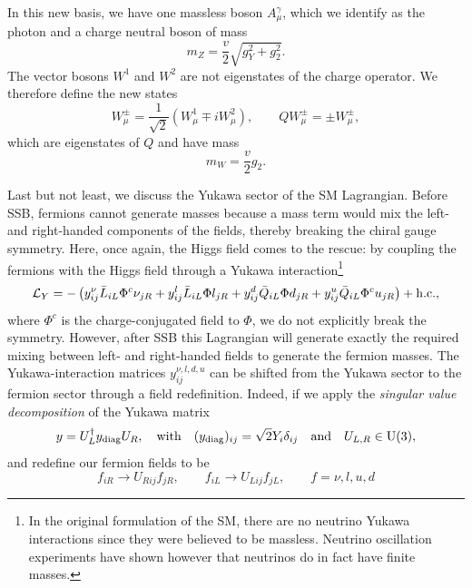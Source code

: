 In this new basis, we have one massless boson $A^\gamma_\mu$, which we identify as the photon and a charge neutral boson of mass
\begin{equation}
m_Z = \frac{v}{2} \sqrt{g_Y^2 + g_2^2}.
\end{equation}
The vector bosons $W^1$ and $W^2$ are not eigenstates of the charge operator. We therefore define the new states
\begin{equation}
W^\pm_\mu = \frac{1}{\sqrt{2}} \left( W^1_\mu \mp i W^2_\mu \right), \qquad Q W_\mu^\pm = \pm W_\mu^\pm,
\end{equation}
which are eigenstates of $Q$ and have mass
\begin{equation}
m_W = \frac{v}{2} g_2.
\end{equation}

Last but not least, we discuss the Yukawa sector of the \acs{SM} Lagrangian. Before \acs{SSB}, fermions cannot generate masses because a mass term would mix the left- and right-handed components of the fields, thereby breaking the chiral gauge symmetry. Here, once again, the Higgs field comes to the rescue: by coupling the fermions with the Higgs field through a Yukawa interaction\footnote{In the original formulation of the \acs{SM}, there are no neutrino Yukawa interactions since they were believed to be massless. Neutrino oscillation experiments have shown however that neutrinos do in fact have finite masses.}
\begin{equation}
\mathcal{L}_Y = - \left( y_{ij}^\nu \bar{L}_{iL} \Phi^c \nu_{jR} + y_{ij}^l \bar{L}_{iL} \Phi l_{jR} + y_{ij}^d \bar{Q}_{iL} \Phi d_{jR} + y_{ij}^u \bar{Q}_{iL} \Phi^c u_{jR} \right) + \mathrm{h.c.},
\end{equation}
where $\Phi^c$ is the charge-conjugated field to $\Phi$, we do not explicitly break the symmetry. However, after \acs{SSB} this Lagrangian will generate exactly the required mixing between left- and right-handed fields to generate the fermion masses. The Yukawa-interaction matrices $y_{ij}^{\nu,l, d, u}$ can be shifted from the Yukawa sector to the fermion sector through a field redefinition. Indeed, if we apply the \textit{singular value decomposition} of the Yukawa matrix
\begin{equation}
y = U_L^\dagger y_{\mathrm{diag}} U_R, \quad \text{with} \quad (y_{\mathrm{diag}})_{ij} = \sqrt{2} Y_i \delta_{ij} \quad \text{and} \quad U_{L,R} \in \mathrm{U}(3),
\end{equation}
and redefine our fermion fields to be
\begin{equation}
f_{iR} \longrightarrow U_{Rij} f_{jR}, \qquad f_{iL} \longrightarrow U_{Lij} f_{jL}, \qquad f = \nu, l, u, d
\end{equation}
